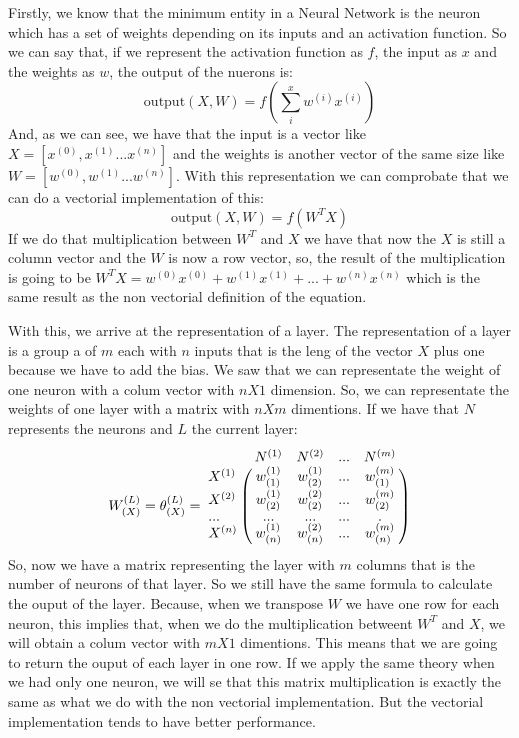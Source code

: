 \documentclass[12pt]{article}
\begin{document}
Firstly, we know that the minimum entity in a Neural Network is the neuron which has a set of weights depending on its inputs and an activation function. So we can say that, if we represent the activation function as $f$, the input as $x$ and the weights as $w$, the output of the nuerons is:
\begin{equation}
\textrm{output}(X,W)=f(\displaystyle\sum_{i}^{x}w^{(i)}x^{(i)})
\end{equation}
And, as we can see, we have that the input is a vector like $X=[x^{(0)},x^{(1)}...x^{(n)}]$ and the weights is another vector of the same size like $W=[w^{(0)},w^{(1)}...w^{(n)}]$. With this representation we can comprobate that we can do a vectorial implementation of this:
\begin{equation}
\textrm{output}(X,W)=f(W^{T}X)
\end{equation}
If we do that multiplication between $W^{T}$ and $X$ we have that now the $X$ is still a column vector and the $W$ is now a row vector, so, the result of the multiplication is going to be $W^{T}X = w^{(0)}x^{(0)}+w^{(1)}x^{(1)}+...+w^{(n)}x^{(n)}$ which is the same result as the non vectorial definition of the equation.

With this, we arrive at the representation of a layer. The representation of a layer is a group a of $m$ each with $n$ inputs that is the leng of the vector $X$ plus one because we have to add the bias. We saw that we can representate the weight of one neuron with a colum vector with $nX1$ dimension. So, we can representate the weights of one layer with a matrix with $nXm$ dimentions. If we have that $N$ represents the neurons and $L$ the current layer:
\begin{equation}
W_{(X)}^{(L)}= \theta_{(X)}^{(L)} = \bordermatrix{~ & N^{(1)} & N^{(2)} & \textrm{...} & N^{(m)} \cr X^{(1)} & w_{(1)}^{(1)} & w_{(2)}^{(1)}&\textrm{...}&w_{(1)}^{(m)} \cr X^{(2)} & w_{(2)}^{(1)} & w_{(2)}^{(2)}&\textrm{...}&w_{(2)}^{(m)} \cr \textrm{...} & \textrm{...} & \textrm{...} &\textrm{...}&. \cr X^{(n)}&w_{(n)}^{(1)}&w_{(n)}^{(2)}&\textrm{...}&w_{(n)}^{(m)}\cr}
\end{equation}
 So, now we have a matrix representing the layer with $m$ columns that is the number of neurons of that layer. So we still have the same formula to calculate the ouput of the layer. Because, when we transpose $W$ we have one row for each neuron, this implies that, when we do the multiplication betweent $W^T$ and $X$, we will obtain a colum vector with $mX1$ dimentions. This means that we are going to return the ouput of each layer in one row. If we apply the same theory when we had only one neuron, we will se that this matrix multiplication is exactly the same as what we do with the non vectorial implementation. But the vectorial implementation tends to have better performance.
 
\end{document}
